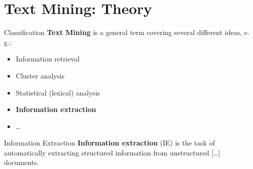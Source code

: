 \documentclass[xcolor=x11names, aspectratio=169]{beamer}
\begin{document}
{ %
    \begin{frame}[plain]
     \end{frame}
}

\section{Text Mining: Theory}%

\begin{frame}{Classification}
\textbf{Text Mining} is a \alert{general term} covering several different ideas, e.\,g.:\pause

\begin{itemize}[<+->]
\item Information retrieval
\item Cluster analysis
\item Statistical (lexical) analysis
\item \textbf{Information extraction}
\item\dots
\end{itemize}
\end{frame}

\begin{frame}{Information Extraction}
\textbf{Information extraction} (IE) is the task of automatically extracting structured information from unstructured [\dots] documents.

\end{frame}

\maketitle
\end{document}
